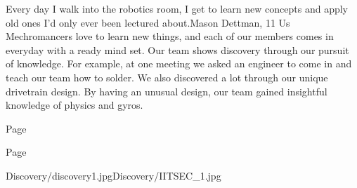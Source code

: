 {Every day I walk into the robotics room, I get to learn new concepts and apply old ones I'd only ever been lectured about.}{Mason Dettman, 11}
{Us Mechromancers love to learn new things, and each of our members comes in everyday with a ready mind set. Our team shows discovery through our pursuit of knowledge. For example, at one meeting we asked an engineer to come in and teach our team how to solder. We also discovered a lot through our unique drivetrain design. By having an unusual design, our team gained insightful knowledge of physics and gyros. }
{
\item[$\blacksquare$] Page \pageref{Discovery:1}
 \item[$\blacksquare$] Page \pageref{Discovery:2}
 }
{Discovery/discovery1.jpg}{Discovery/IITSEC_1.jpg}